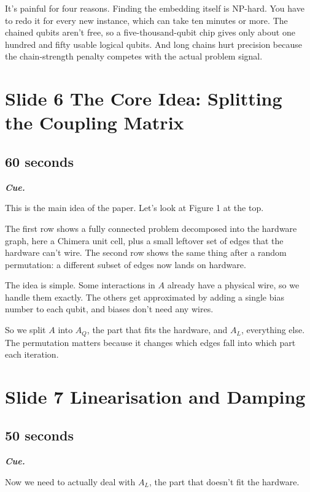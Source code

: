 \documentclass[11pt,a4paper]{article}
\newenvironment{cue}{%
  \par\noindent
  \begin{minipage}{\linewidth}
  \color{muted}\small\itshape
  \textbf{\color{accent}\upshape Cue.}~%
}{%
  \end{minipage}\par\medskip
}
\begin{document}
It's painful for four reasons. Finding the embedding itself is NP-hard. You have to redo it for every new instance, which can take ten minutes or more. The chained qubits aren't free, so a five-thousand-qubit chip gives only about one hundred and fifty usable logical qubits. And long chains hurt precision because the chain-strength penalty competes with the actual problem signal.

\section*{Slide 6 \quad The Core Idea: Splitting the Coupling Matrix}
\subsection*{60 seconds}

\begin{cue}
This is the main idea of the paper. Let's look at Figure 1 at the top.
\end{cue}

The first row shows a fully connected problem decomposed into the hardware graph, here a Chimera unit cell, plus a small leftover set of edges that the hardware can't wire. The second row shows the same thing after a random permutation: a different subset of edges now lands on hardware.

The idea is simple. Some interactions in $A$ already have a physical wire, so we handle them exactly. The others get approximated by adding a single bias number to each qubit, and biases don't need any wires.

So we split $A$ into $A_Q$, the part that fits the hardware, and $A_L$, everything else. The permutation matters because it changes which edges fall into which part each iteration.

\section*{Slide 7 \quad Linearisation and Damping}
\subsection*{50 seconds}

\begin{cue}
Now we need to actually deal with $A_L$, the part that doesn't fit the hardware.
\end{cue}
\end{document}
